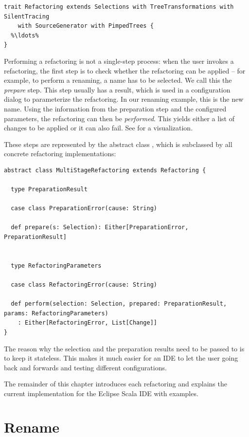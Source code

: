 \documentclass[10pt,a4paper,oneside]{scrreprt}
\begin{document}
\begin{lstlisting}
trait Refactoring extends Selections with TreeTransformations with SilentTracing 
    with SourceGenerator with PimpedTrees {
  %\ldots%
}
\end{lstlisting}

Performing a refactoring is not a single-step process: when the user invokes a refactoring, the first step is to check whether the refactoring can be applied -- for example, to perform a renaming, a name has to be selected. We call this the \textit{prepare} step. This step usually has a result, which is used in a configuration dialog to parameterize the refactoring. In our renaming example, this is the new name. Using the information from the preparation step and the configured parameters, the refactoring can then be \textit{performed}. This yields either a list of changes to be applied or it can also fail. See   for a visualization.

These steps are represented by the abstract class , which is subclassed by all concrete refactoring implementations:

\begin{lstlisting}
abstract class MultiStageRefactoring extends Refactoring {
  
  type PreparationResult
  
  case class PreparationError(cause: String)

  def prepare(s: Selection): Either[PreparationError, PreparationResult]

  
  type RefactoringParameters
  
  case class RefactoringError(cause: String)
  
  def perform(selection: Selection, prepared: PreparationResult, params: RefactoringParameters)
    : Either[RefactoringError, List[Change]]
}
\end{lstlisting}

The reason why the selection and the preparation results need to be passed to  is to keep it stateless. This makes it much easier for an IDE to let the user going back and forwards and testing different configurations.

The remainder of this chapter introduces each refactoring and explains the current implementation for the Eclipse Scala IDE with examples. 

\section{Rename}
\end{document}
